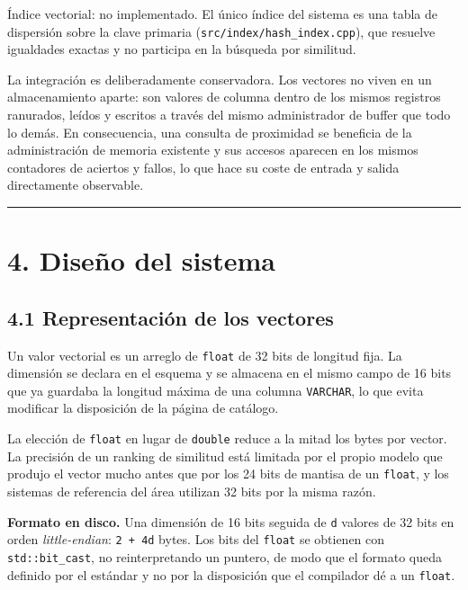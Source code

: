 \documentclass[11pt,a4paper]{article}
\let\pandocsubsection\subsection
\let\subsection\section
\let\subsubsection\pandocsubsection
\begin{document}
Índice vectorial: no implementado. El único índice del sistema es una
tabla de dispersión sobre la clave primaria
(\texttt{src/index/hash\_index.cpp}), que resuelve igualdades exactas y
no participa en la búsqueda por similitud.

La integración es deliberadamente conservadora. Los vectores no viven en
un almacenamiento aparte: son valores de columna dentro de los mismos
registros ranurados, leídos y escritos a través del mismo administrador
de buffer que todo lo demás. En consecuencia, una consulta de proximidad
se beneficia de la administración de memoria existente y sus accesos
aparecen en los mismos contadores de aciertos y fallos, lo que hace su
coste de entrada y salida directamente observable.

\begin{center}\rule{0.5\linewidth}{0.5pt}\end{center}

\subsection{4. Diseño del sistema}\label{4-diseuxf1o-del-sistema}

\subsubsection{4.1 Representación de los
vectores}\label{41-representaciuxf3n-de-los-vectores}

Un valor vectorial es un arreglo de \texttt{float} de 32 bits de
longitud fija. La dimensión se declara en el esquema y se almacena en el
mismo campo de 16 bits que ya guardaba la longitud máxima de una columna
\texttt{VARCHAR}, lo que evita modificar la disposición de la página de
catálogo.

La elección de \texttt{float} en lugar de \texttt{double} reduce a la
mitad los bytes por vector. La precisión de un ranking de similitud está
limitada por el propio modelo que produjo el vector mucho antes que por
los 24 bits de mantisa de un \texttt{float}, y los sistemas de
referencia del área utilizan 32 bits por la misma razón.

\textbf{Formato en disco.} Una dimensión de 16 bits seguida de
\texttt{d} valores de 32 bits en orden \emph{little-endian}:
\texttt{2\ +\ 4d} bytes. Los bits del \texttt{float} se obtienen con
\texttt{std::bit\_cast}, no reinterpretando un puntero, de modo que el
formato queda definido por el estándar y no por la disposición que el
compilador dé a un \texttt{float}.
\end{document}
